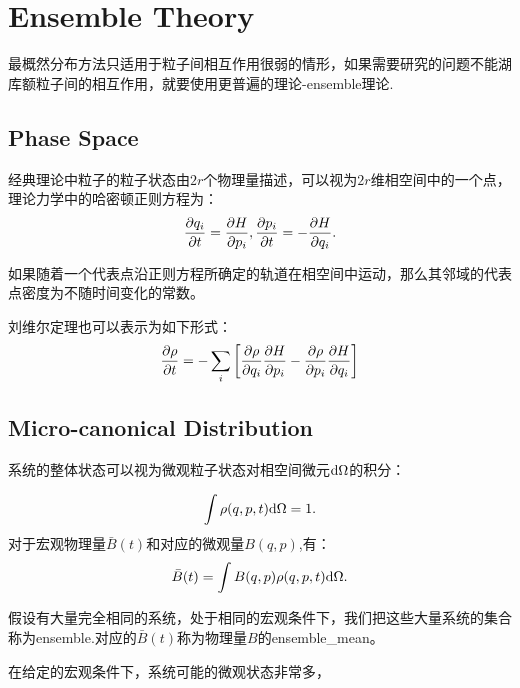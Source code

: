 \chapter{Ensemble Theory}
最概然分布方法只适用于粒子间相互作用很弱的情形，如果需要研究的问题不能湖库额粒子间的相互作用，就要使用更普遍的理论-\gls{ensemble}理论.
\section{Phase Space}
经典理论中粒子的粒子状态由$2r$个物理量描述，可以视为$2r$维相空间中的一个点， 理论力学中的哈密顿正则方程为：
\begin{equation}
    \frac{\partial q_i}{\partial t}=\frac{\partial H}{\partial p_i},\frac{\partial p_i}{\partial t}=-\frac{\partial H}{\partial q_i}.
\end{equation}

\begin{theorem}[刘维尔定理]
    如果随着一个代表点沿正则方程所确定的轨道在相空间中运动，那么其邻域的代表点密度为不随时间变化的常数。
\end{theorem}
刘维尔定理也可以表示为如下形式：
\begin{equation}
    \frac{\partial \rho}{\partial t}=-\sum_i\left[\frac{\partial \rho}{\partial q_i}\frac{\partial H}{\partial p_i}-\frac{\partial \rho}{\partial p_i}\frac{\partial H}{\partial q_i}\right]    
\end{equation}


\section{Micro-canonical Distribution}
系统的整体状态可以视为微观粒子状态对相空间微元$\mathrm{d}\Omega$的积分：

\begin{equation}
    \int \rho(q,p,t)\mathrm{d} \Omega=1.
\end{equation}
对于宏观物理量$\bar{B}(t)$和对应的微观量$B(q,p)$,有：
\begin{equation}
    \bar{B}(t)=\int B(q,p)\rho(q,p,t)\mathrm{d}\Omega.
\end{equation}

假设有大量完全相同的系统，处于相同的宏观条件下，我们把这些大量系统的集合称为\gls{ensemble}.对应的$\bar{B}(t)$称为物理量$B$的\gls{ensemble_mean}。

在给定的宏观条件下，系统可能的微观状态非常多，